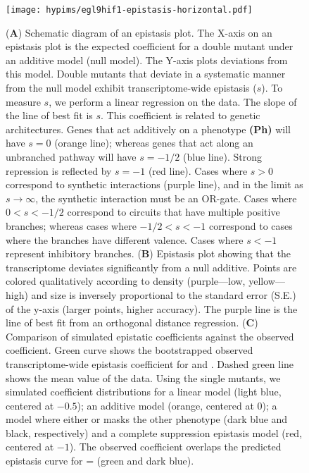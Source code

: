\begin{figure}[tbhp]
\centering
\texttt{[image: hypims/egl9hif1-epistasis-horizontal.pdf]}
\caption{
(\textbf{A}) Schematic diagram of an epistasis plot. The X-axis on an epistasis
plot is the expected coefficient for a double mutant under an additive model
(null model). The Y-axis plots deviations from this model. Double mutants that
deviate in a systematic manner from the null model exhibit transcriptome-wide epistasis
($s$). To measure $s$, we perform a linear regression on the data. The slope of
the line of best fit is $s$. This coefficient is related to genetic architectures.
Genes that act additively on a phenotype \textbf{(Ph)} will have $s=0$ (orange
line); whereas
genes that act along an unbranched pathway will have $s=-1/2$ (blue line).
Strong
repression is reflected by $s=-1$ (red line). Cases where $s>0$ correspond to
synthetic interactions (purple line), and in the limit as $s\rightarrow\infty$,
the synthetic interaction
must be an OR-gate. Cases where $0 < s < -1/2$ correspond to circuits
that have multiple positive branches; whereas cases where
$-1/2<s< -1$ correspond to cases where the branches have different valence.
Cases where $s < -1$ represent inhibitory branches.
(\textbf{B}) Epistasis plot showing
that the \eglvhl{} transcriptome deviates significantly from a null additive.
Points are colored qualitatively according to density (purple---low,
yellow---high) and size is inversely proportional to the standard
error (S.E.) of the y-axis (larger points, higher accuracy). The purple line
is the line of best fit from an orthogonal distance regression.
(\textbf{C}) Comparison of simulated epistatic coefficients against the observed
coefficient. Green curve shows the bootstrapped observed transcriptome-wide epistasis
coefficient for  and . Dashed green line shows the mean
value of the data. Using the single mutants, we simulated coefficient
distributions for a linear model (light blue, centered at $-0.5$);
an additive model (orange, centered at 0); a model where either
 or  masks the other phenotype (dark blue and black,
respectively) and a complete suppression epistasis model (red, centered at $-1$).
The observed coefficient overlaps the predicted epistasis curve for
\eglvhl{} = \egl{} (green and dark blue).
}
\label{fig:egl9epistasis}
\end{figure}

